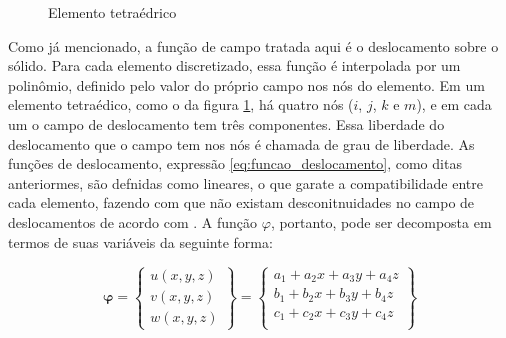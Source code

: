 \begin{figure} \label{fig:tetraedro}
    \centering
    \caption{Elemento tetraédrico}
\end{figure}

Como já mencionado, a função de campo tratada aqui é o deslocamento sobre o sólido. Para cada elemento discretizado, essa função é interpolada por um polinômio, definido pelo valor do próprio campo nos nós do elemento. Em um elemento tetraédico, como o da figura \ref{fig:tetraedro}, há quatro nós ($i$, $j$, $k$ e $m$), e em cada um o campo de deslocamento tem três componentes. Essa liberdade do deslocamento que o campo tem nos nós é chamada de grau de liberdade. As funções de deslocamento, expressão \ref{eq:funcao_deslocamento}, como ditas anteriormes, são defnidas como lineares, o que garate a compatibilidade entre cada elemento, fazendo com que não existam desconitnuidades no campo de deslocamentos de acordo com . A função $\varphi$, portanto, pode ser decomposta em termos de suas variáveis da seguinte forma:

\begin{equation} \label{eq:linear}
    \mathbf{\varphi} = 
    \begin{Bmatrix}
        u(x,y,z) \\ v(x,y,z) \\ w(x,y,z)
    \end{Bmatrix} 
    = \begin{Bmatrix}
        a_1 + a_2 x + a_3 y + a_4 z\\
        b_1 + b_2 x + b_3 y + b_4 z\\
        c_1 + c_2 x + c_3 y + c_4 z\\
    \end{Bmatrix}
\end{equation}

